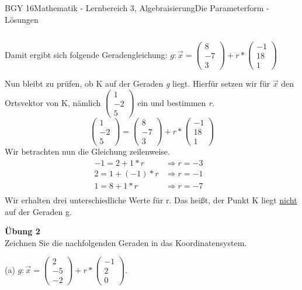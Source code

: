 \documentclass[oneside,openany,headings=optiontotoc,11pt,numbers=noenddot]{scrreprt}
\begin{document}
\begin{worksheet}{BGY 16}{Mathematik - Lernbereich 3, Algebraisierung}{Die Parameterform - Lösungen}
\begin{framed}
\begin{tabularx}{\textwidth}{XX}
			\end{tabularx}
			Damit ergibt sich folgende Geradengleichung: \(g: \vec{x} = \left(\begin{array}{c}8\\-7\\3\end{array}\right) + r*\left(\begin{array}{c}-1\\18\\1\end{array}\right)\)\\
			\par\noindent
			Nun bleibt zu prüfen, ob K auf der Geraden \textit{g} liegt. Hierfür setzen wir für \(\vec{x}\)	den Ortsvektor von K, nämlich \(\left(\begin{array}{c}1\\-2\\5\end{array}\right)\) ein und bestimmen \textit{r}.\\
			\[\left(\begin{array}{c}1\\-2\\5\end{array}\right) = \left(\begin{array}{c}8\\-7\\3\end{array}\right) + r*\left(\begin{array}{c}-1\\18\\1\end{array}\right)\]
			Wir betrachten nun die Gleichung zeilenweise.
			\[\begin{array}{llc}
			-1 = 2 + 1*r& \Rightarrow r = -3&\\
			2 = 1 + (-1)*r & \Rightarrow r = -1&\\
			1 = 8 + 1*r & \Rightarrow r = -7 &\\
			\end{array}\]
			Wir erhalten drei unterschiedliche Werte für r. Das heißt, der Punkt K liegt \underline{nicht} auf der Geraden g.
		\end{framed}
		\newpage
		\begin{framed}
			\noindent
			\tiny{\color{codegray}\textbf{Übung 2}\\Zeichnen Sie die nachfolgenden Geraden in das Koordinatensystem.
			\par\noindent
			(a) \(g: \vec{x} = \left(\begin{array}{c}2\\-5\\-2\end{array}\right) + r* \left(\begin{array}{c}-1\\2\\0\end{array}\right)\).}
			

\end{framed}
\end{worksheet}
\end{document}
